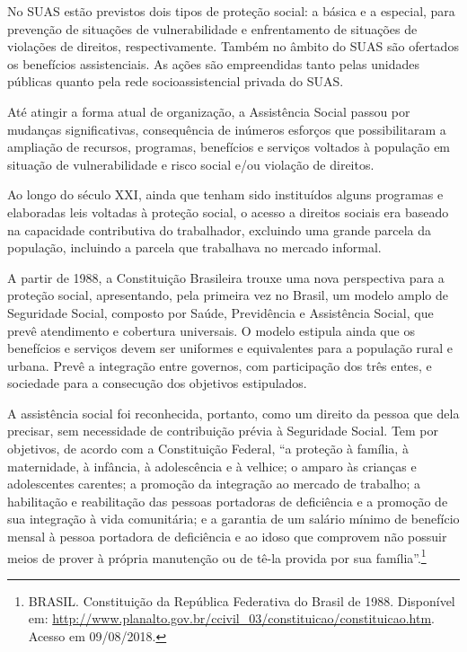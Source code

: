 \documentclass[
  letterpaper,
  DIV=11,
  numbers=noendperiod]{scrreprt}
\begin{document}
No SUAS estão previstos dois tipos de proteção social: a básica e a
especial, para prevenção de situações de vulnerabilidade e enfrentamento
de situações de violações de direitos, respectivamente. Também no âmbito
do SUAS são ofertados os benefícios assistenciais. As ações são
empreendidas tanto pelas unidades públicas quanto pela rede
socioassistencial privada do SUAS.

Até atingir a forma atual de organização, a Assistência Social passou
por mudanças significativas, consequência de inúmeros esforços que
possibilitaram a ampliação de recursos, programas, benefícios e serviços
voltados à população em situação de vulnerabilidade e risco social e/ou
violação de direitos.

Ao longo do século XXI, ainda que tenham sido instituídos alguns
programas e elaboradas leis voltadas à proteção social, o acesso a
direitos sociais era baseado na capacidade contributiva do trabalhador,
excluindo uma grande parcela da população, incluindo a parcela que
trabalhava no mercado informal.

A partir de 1988, a Constituição Brasileira trouxe uma nova perspectiva
para a proteção social, apresentando, pela primeira vez no Brasil, um
modelo amplo de Seguridade Social, composto por Saúde, Previdência e
Assistência Social, que prevê atendimento e cobertura universais. O
modelo estipula ainda que os benefícios e serviços devem ser uniformes e
equivalentes para a população rural e urbana. Prevê a integração entre
governos, com participação dos três entes, e sociedade para a consecução
dos objetivos estipulados.

A assistência social foi reconhecida, portanto, como um direito da
pessoa que dela precisar, sem necessidade de contribuição prévia à
Seguridade Social. Tem por objetivos, de acordo com a Constituição
Federal, ``a proteção à família, à maternidade, à infância, à
adolescência e à velhice; o amparo às crianças e adolescentes carentes;
a promoção da integração ao mercado de trabalho; a habilitação e
reabilitação das pessoas portadoras de deficiência e a promoção de sua
integração à vida comunitária; e a garantia de um salário mínimo de
benefício mensal à pessoa portadora de deficiência e ao idoso que
comprovem não possuir meios de prover à própria manutenção ou de tê-la
provida por sua família''.\footnote{BRASIL. Constituição da República
  Federativa do Brasil de 1988. Disponível em:
  \url{http://www.planalto.gov.br/ccivil_03/constituicao/constituicao.htm}.
  Acesso em 09/08/2018.}
\end{document}
